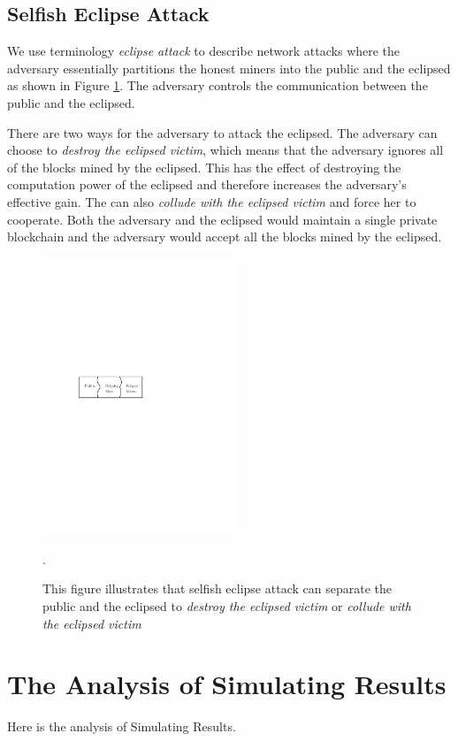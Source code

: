 \documentclass{llncs}
\begin{document}
\subsection{Selfish Eclipse Attack}
\quad We use terminology \emph{eclipse attack} to describe network attacks where the adversary essentially partitions the honest miners into the public and the eclipsed as shown in Figure \ref{eclipsed}. The adversary controls the communication between the public and the eclipsed.

There are two ways for the adversary to attack the eclipsed. The adversary can choose to \emph{destroy the eclipsed victim}, which means that the adversary ignores all of the blocks mined by the eclipsed. This has the effect of destroying the computation power of the eclipsed and therefore increases the adversary's effective gain. The can also \emph{collude with the eclipsed victim} and force her to cooperate. Both the adversary and the eclipsed would maintain a single private blockchain and the adversary would accept all the blocks mined by the eclipsed.

\vspace{-4mm}
\begin{figure}
\centering
\includegraphics[width=2.3in]{Figures/eclipse.pdf}
\vspace{-3mm}
\caption{This figure illustrates that selfish eclipse attack can separate the public and the eclipsed to \emph{destroy the eclipsed victim} or \emph{collude with the eclipsed victim}}. 
\label{eclipsed}
\end{figure}
\section{The Analysis of Simulating Results}
Here is the analysis of Simulating Results.
\end{document}

